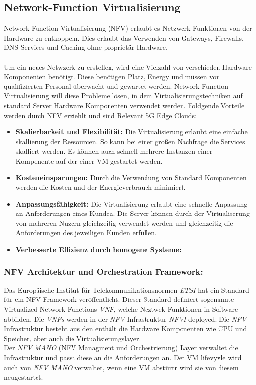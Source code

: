 \documentclass[runningheads]{llncs}
\numberwithin{figure}{section}
\begin{document}
\subsection{Network-Function Virtualisierung}
\label{subsec:Network-Function Virtualisierung}
Network-Function Virtualisierung (NFV) erlaubt es Netzwerk Funktionen von der Hardware zu entkoppeln.
Dies erlaubt das Verwenden von Gateways, Firewalls, DNS Services und Caching ohne proprietär Hardware.
\\
\\
Um ein neues Netwzerk zu erstellen, wird eine Vielzahl von verschieden Hardware Komponenten benötigt. 
Diese benötigen Platz, Energy und müssen von qualifizierten Personal überwacht und gewartet werden. 
Network-Function Virtualisierung will diese Probleme lösen, in dem Virtualisierungstechniken auf standard
Server Hardware Komponenten verwendet werden. 
Foldgende Vorteile werden durch NFV erziehlt und sind Relevant 5G Edge Clouds: \cite{nfv_wp}
\begin{itemize}
  \item \textbf{Skalierbarkeit und Flexibilität:} Die Virtualisierung erlaubt eine einfache skallierung der Ressourcen.
  So kann bei einer großen Nachfrage die Services skalliert werden. Es können auch schnell mehrere Instanzen einer Komponente auf 
  der einer VM gestartet werden.
  \item \textbf{Kosteneinsparungen:} Durch die Verwendung von Standard Komponenten werden die Kosten und der Energieverbrauch minimiert.
  \item \textbf{Anpassungsfähigkeit:} Die Virtualisierung erlaubt eine schnelle Anpassung an Anforderungen eines Kunden. 
  Die Server können durch der Virtualiserung von mehreren Nuzern gleichzeitig verwendet werden und gleichzeitig die Anforderungen des jeweiligen
  Kunden erfüllen.
  \item \textbf{Verbesserte Effizienz durch homogene Systeme:}
\end{itemize}
\subsubsection{NFV Architektur und Orchestration Framework:}
Das Europäische Institut für Telekommunikationsnormen \textit{ETSI} hat ein Standard für ein NFV Framework veröffentlicht.
Dieser Standard definiert sogenannte Virtualized Network Functions \textit{VNF}, welche Neztwek Funktionen in Software abbilden.
Die \textit{VNFs} werden in der \textit{NFV} Infrastruktur \textit{NFVI} deployed. Die \textit{NFV} Infrastruktur besteht aus den
enthält die Hardware Komponenten wie CPU und Speicher, aber auch die Virtualisierungslayer. \\
Der \textit{NFV MANO} (NFV Managment und Orchestrierung) Layer verwaltet die Infrastruktur und passt diese an die Anforderungen an.
Der VM lifevyvle wird auch von \textit{NFV MANO} verwaltet, wenn eine VM abstürtr wird sie von diesem neugestartet.
\end{document}
